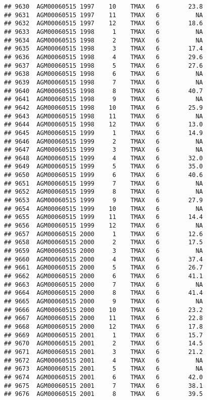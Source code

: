 \documentclass{article}\usepackage[]{graphicx}\usepackage[]{color}
\makeatletter
\newenvironment{kframe}{%
 \def\at@end@of@kframe{}%
 \ifinner\ifhmode%
  \def\at@end@of@kframe{\end{minipage}}%
  \begin{minipage}{\columnwidth}%
 \fi\fi%
 \def\FrameCommand##1{\hskip\@totalleftmargin \hskip-\fboxsep
 \colorbox{shadecolor}{##1}\hskip-\fboxsep
     \hskip-\linewidth \hskip-\@totalleftmargin \hskip\columnwidth}%
 \MakeFramed {\advance\hsize-\width
   \@totalleftmargin\z@ \linewidth\hsize
   \@setminipage}}%
 {\par\unskip\endMakeFramed%
 \at@end@of@kframe}
\newenvironment{knitrout}{}{} %
\makeatother
\begin{document}
\begin{knitrout}
\begin{kframe}
\begin{verbatim}
## 9630  AGM00060515 1997    10    TMAX   6        23.8
## 9631  AGM00060515 1997    11    TMAX   6          NA
## 9632  AGM00060515 1997    12    TMAX   6        18.6
## 9633  AGM00060515 1998     1    TMAX   6          NA
## 9634  AGM00060515 1998     2    TMAX   6          NA
## 9635  AGM00060515 1998     3    TMAX   6        17.4
## 9636  AGM00060515 1998     4    TMAX   6        29.6
## 9637  AGM00060515 1998     5    TMAX   6        27.6
## 9638  AGM00060515 1998     6    TMAX   6          NA
## 9639  AGM00060515 1998     7    TMAX   6          NA
## 9640  AGM00060515 1998     8    TMAX   6        40.7
## 9641  AGM00060515 1998     9    TMAX   6          NA
## 9642  AGM00060515 1998    10    TMAX   6        25.9
## 9643  AGM00060515 1998    11    TMAX   6          NA
## 9644  AGM00060515 1998    12    TMAX   6        13.0
## 9645  AGM00060515 1999     1    TMAX   6        14.9
## 9646  AGM00060515 1999     2    TMAX   6          NA
## 9647  AGM00060515 1999     3    TMAX   6          NA
## 9648  AGM00060515 1999     4    TMAX   6        32.0
## 9649  AGM00060515 1999     5    TMAX   6        35.0
## 9650  AGM00060515 1999     6    TMAX   6        40.6
## 9651  AGM00060515 1999     7    TMAX   6          NA
## 9652  AGM00060515 1999     8    TMAX   6          NA
## 9653  AGM00060515 1999     9    TMAX   6        27.9
## 9654  AGM00060515 1999    10    TMAX   6          NA
## 9655  AGM00060515 1999    11    TMAX   6        14.4
## 9656  AGM00060515 1999    12    TMAX   6          NA
## 9657  AGM00060515 2000     1    TMAX   6        12.6
## 9658  AGM00060515 2000     2    TMAX   6        17.5
## 9659  AGM00060515 2000     3    TMAX   6          NA
## 9660  AGM00060515 2000     4    TMAX   6        37.4
## 9661  AGM00060515 2000     5    TMAX   6        26.7
## 9662  AGM00060515 2000     6    TMAX   6        41.1
## 9663  AGM00060515 2000     7    TMAX   6          NA
## 9664  AGM00060515 2000     8    TMAX   6        41.4
## 9665  AGM00060515 2000     9    TMAX   6          NA
## 9666  AGM00060515 2000    10    TMAX   6        23.2
## 9667  AGM00060515 2000    11    TMAX   6        22.8
## 9668  AGM00060515 2000    12    TMAX   6        17.8
## 9669  AGM00060515 2001     1    TMAX   6        15.7
## 9670  AGM00060515 2001     2    TMAX   6        14.5
## 9671  AGM00060515 2001     3    TMAX   6        21.2
## 9672  AGM00060515 2001     4    TMAX   6          NA
## 9673  AGM00060515 2001     5    TMAX   6          NA
## 9674  AGM00060515 2001     6    TMAX   6        42.0
## 9675  AGM00060515 2001     7    TMAX   6        38.1
## 9676  AGM00060515 2001     8    TMAX   6        39.5

\end{verbatim}
\end{kframe}
\end{knitrout}
\end{document}
